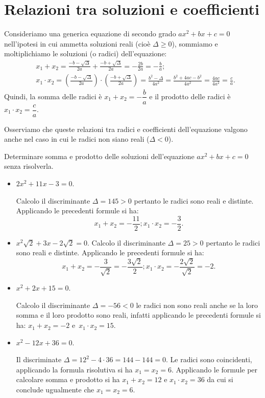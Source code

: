 \section{Relazioni tra soluzioni e coefficienti}
\label{sec:eq2gr_coefficienti}

Consideriamo una generica equazione di secondo grado $a x^{2} + b x + c = 0$ 
nell'ipotesi in cui ammetta soluzioni reali (cioè $\Delta \geq 0$), sommiamo e 
moltiplichiamo le soluzioni (o radici) dell'equazione:
\begin{align*}
& x_{1} + x_{2} = \frac{- b - \sqrt{\Delta}}{2 a} + \frac{- b + 
\sqrt{\Delta}}{2 
a} = - \frac{2 b}{2 a}=- \frac{b}{a};\\
& x_{1} \cdot x_{2}=\left( \frac{- b - \sqrt{\Delta}}{2 a} \right) \cdot \left( 
\frac{- b + \sqrt{\Delta}}{2 a} \right)= \frac{b^{2} - \Delta}{4 
a^2}=\frac{b^{2} + 4 a c - b^{2}}{4 a^{2}} =\frac{4 a c}{4 a^{2}}=\frac{c}{a}.
\end{align*}
Quindi, la somma delle radici è $x_{1} + x_{2}=- \dfrac{b}{a}$ e il prodotto 
delle radici è $x_{1} \cdot x_{2}=\dfrac{c}{a}$.

Osserviamo che queste relazioni tra radici e coefficienti dell'equazione 
valgono 
anche nel caso in cui le radici non siano reali ($\Delta<0$).
\begin{esempio}
Determinare somma e prodotto delle soluzioni dell'equazione $a x^{2} + b x +c = 
0$ senza risolverla.
 \begin{itemize}
 \item $2 x^{2} + 11 x - 3 = 0$.

 Calcolo il discriminante $\Delta = 145 > 0$ pertanto le radici sono reali e 
distinte. Applicando le precedenti formule si ha: 
\[x_{1} + x_{2} = - \frac{11}{2}; x_{1} \cdot x_{2} = - \frac{3}{2}.\]

 \item $x^{2} \sqrt{2} + 3 x - 2 \sqrt{2} = 0$.
 Calcolo il discriminante $\Delta = 25 > 0$ pertanto le radici sono reali e 
distinte. Applicando le precedenti formule si ha: 
\[x_{1} + x_{2} = - \frac{3}{\sqrt{2}} = - \frac{3 \sqrt{2}}{2}; x_{1} \cdot 
x_{2} = - \frac{2 \sqrt{2}}{\sqrt{2}} = - 2.\]

 \item $x^{2} + 2 x + 15 = 0$.

 Calcolo il discriminante $\Delta = - 56 < 0$ le radici non sono reali anche se 
la loro somma e il loro prodotto sono reali, infatti applicando le precedenti 
formule si ha: $x_{1} + x_{2} = - 2$ e~$x_{1} \cdot x_{2} = 15$.

 \item $x^{2} - 12 x + 36 = 0$.

 Il discriminate $\Delta = 12^{2} - 4 \cdot 36 = 144 - 144 = 0$. Le radici sono 
coincidenti, applicando la formula risolutiva si ha $x_{1} = x_{2} = 6$. 
Applicando le formule per calcolare somma e prodotto si ha $x_{1} + x_{2} = 12$ 
e $x_{1} \cdot x_{2} = 36$ da cui si conclude ugualmente che $x_{1} = x_{2} = 
6$.
 \end{itemize}
\end{esempio}

